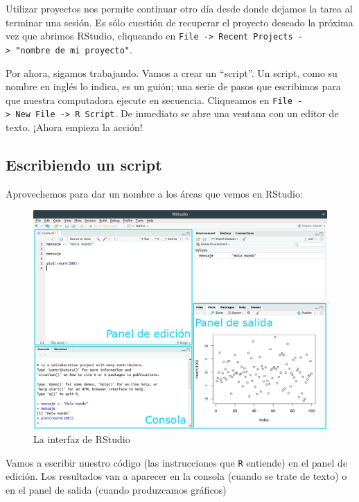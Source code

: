 \documentclass[
]{book}
\begin{document}
Utilizar proyectos nos permite continuar otro día desde donde dejamos la tarea al terminar una sesión. Es sólo cuestión de recuperar el proyecto deseado la próxima vez que abrimos RStudio, cliqueando en \texttt{File\ -\textgreater{}\ Recent\ Projects\ -\textgreater{}\ "nombre\ de\ mi\ proyecto"}.

Por ahora, sigamos trabajando. Vamos a crear un ``script''. Un script, como su nombre en inglés lo indica, es un guión; una serie de pasos que escribimos para que nuestra computadora ejecute en secuencia. Cliqueamos en \texttt{File\ -\textgreater{}\ New\ File\ -\textgreater{}\ R\ Script}. De inmediato se abre una ventana con un editor de texto. ¡Ahora empieza la acción!

\hypertarget{escribiendo-un-script}{%
\subsection{Escribiendo un script}\label{escribiendo-un-script}}

Aprovechemos para dar un nombre a los áreas que vemos en RStudio:

\begin{figure}
\includegraphics[width=1\linewidth]{imagenes/Interfaz_RStudio} \caption{La interfaz de RStudio}\label{fig:unnamed-chunk-7}
\end{figure}

Vamos a escribir nuestro código (las instrucciones que \texttt{R} entiende) en el panel de edición. Los resultados van a aparecer en la consola (cuando se trate de texto) o en el panel de salida (cuando produzcamos gráficos)
\end{document}
